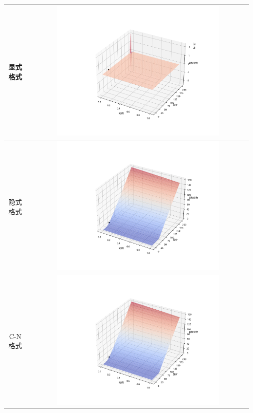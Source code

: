 \documentclass{article}
\begin{document}
\begin{longtable}{|c|c|}
    \hline
    显式格式 & \includegraphics[width=0.75\textwidth]{Images/13_option_price_surface_Exp_(100,100).png} \\
    \hline
    隐式格式 & \includegraphics[width=0.75\textwidth]{Images/10_option_price_surface_Imp_(100,100).png} \\
    \hline
    C-N格式 & \includegraphics[width=0.75\textwidth]{Images/14_option_price_surface_CN_(100,100).png} \\
    \hline
\end{longtable}
\end{document}
